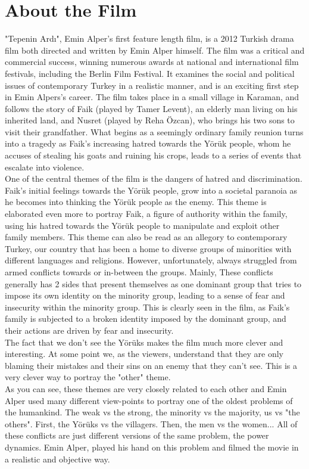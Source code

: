 \documentclass[12pt]{article}
\begin{document}
\section{About the Film}
\par
"Tepenin Ardı", Emin Alper's first feature length film, is a 2012 Turkish drama film both directed and written by Emin Alper himself. The film was a critical and commercial success, winning numerous awards at national and international film festivals, including the Berlin Film Festival. It examines the social and political issues of contemporary Turkey in a realistic manner, and is an exciting first step in Emin Alpers's career. The film takes place in a small village in Karaman, and follows the story of Faik (played by Tamer Levent), an elderly man living on his inherited land, and Nusret (played by Reha Özcan), who brings his two sons to visit their grandfather. What begins as a seemingly ordinary family reunion turns into a tragedy as Faik's increasing hatred towards the Yörük people, whom he accuses of stealing his goats and ruining his crops, leads to a series of events that escalate into violence.
\\
One of the central themes of the film is the dangers of hatred and discrimination. Faik's initial feelings towards the Yörük people, grow into a societal paranoia as he becomes into thinking the Yörük people as the enemy. This theme is elaborated even more to portray Faik, a figure of authority within the family, using his hatred towards the Yörük people to manipulate and exploit other family members. This theme can also be read as an allegory to contemporary Turkey, our country that has been a home to diverse groups of minorities with different languages and religions. However, unfortunately, always struggled from armed conflicts towards or in-between the groups. Mainly, These conflicts generally has 2 sides that present themselves as one dominant group that tries to impose its own identity on the minority group, leading to a sense of fear and insecurity within the minority group. This is clearly seen in the film, as Faik's family is subjected to a broken identity imposed by the dominant group, and their actions are driven by fear and insecurity.
\\
The fact that we don't see the Yörüks makes the film much more clever and interesting. At some point we, as the viewers, understand that they are only blaming their mistakes and their sins on an enemy that they can't see. This is a very clever way to portray the "other" theme.
\\
As you can see, these themes are very closely related to each other and Emin Alper used many different view-points to portray one of the oldest problems of the humankind. The weak vs the strong, the minority vs the majority, us vs "the others". First, the Yörüks vs the villagers. Then, the men vs the women... All of these conflicts are just different versions of the same problem, the power dynamics. Emin Alper, played his hand on this problem and filmed the movie in a realistic and objective way.
\end{document}
